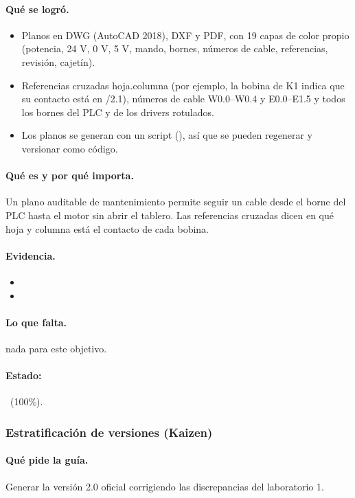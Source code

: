 \documentclass[a4paper,11pt]{article}
\begin{document}
\paragraph{Qué se logró.}
\begin{itemize}
\item Planos en DWG (AutoCAD 2018), DXF y PDF, con 19 capas de color propio (potencia, 24 V, 0 V, 5 V, mando, bornes, números de cable, referencias, revisión, cajetín).
\item Referencias cruzadas hoja.columna (por ejemplo, la bobina de K1 indica que su contacto está en /2.1), números de cable W0.0–W0.4 y E0.0–E1.5 y todos los bornes del PLC y de los drivers rotulados.
\item Los planos se generan con un script (), así que se pueden regenerar y versionar como código.
\end{itemize}
\paragraph{Qué es y por qué importa.} Un plano auditable de mantenimiento permite seguir un cable desde el borne del PLC hasta el motor sin abrir el tablero. Las referencias cruzadas dicen en qué hoja y columna está el contacto de cada bobina.
\paragraph{Evidencia.}
\begin{itemize}\small
\item {}
\item {}
\end{itemize}
\paragraph{Lo que falta.} nada para este objetivo.
\paragraph{Estado:} \cumple~(100\%).
\subsubsection{Estratificación de versiones (Kaizen)}
\paragraph{Qué pide la guía.} Generar la versión 2.0 oficial corrigiendo las discrepancias del laboratorio 1.
\end{document}
